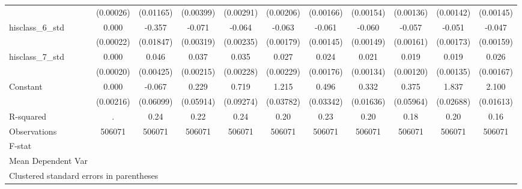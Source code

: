 {\begin{tabular}{l*{10}{c}}
                    &   (0.00026)         &   (0.01165)         &   (0.00399)         &   (0.00291)         &   (0.00206)         &   (0.00166)         &   (0.00154)         &   (0.00136)         &   (0.00142)         &   (0.00145)         \\
hisclass\_6\_std      &       0.000         &      -0.357\sym{***}&      -0.071\sym{***}&      -0.064\sym{***}&      -0.063\sym{***}&      -0.061\sym{***}&      -0.060\sym{***}&      -0.057\sym{***}&      -0.051\sym{***}&      -0.047\sym{***}\\
                    &   (0.00022)         &   (0.01847)         &   (0.00319)         &   (0.00235)         &   (0.00179)         &   (0.00145)         &   (0.00149)         &   (0.00161)         &   (0.00173)         &   (0.00159)         \\
hisclass\_7\_std      &       0.000         &       0.046\sym{***}&       0.037\sym{***}&       0.035\sym{***}&       0.027\sym{***}&       0.024\sym{***}&       0.021\sym{***}&       0.019\sym{***}&       0.019\sym{***}&       0.026\sym{***}\\
                    &   (0.00020)         &   (0.00425)         &   (0.00215)         &   (0.00228)         &   (0.00229)         &   (0.00176)         &   (0.00134)         &   (0.00120)         &   (0.00135)         &   (0.00167)         \\
Constant            &       0.000         &      -0.067         &       0.229\sym{***}&       0.719\sym{***}&       1.215\sym{***}&       0.496\sym{***}&       0.332\sym{***}&       0.375\sym{***}&       1.837\sym{***}&       2.100\sym{***}\\
                    &   (0.00216)         &   (0.06099)         &   (0.05914)         &   (0.09274)         &   (0.03782)         &   (0.03342)         &   (0.01636)         &   (0.05964)         &   (0.02688)         &   (0.01613)         \\
\hline
R-squared           &           .         &        0.24         &        0.22         &        0.24         &        0.20         &        0.23         &        0.20         &        0.18         &        0.20         &        0.16         \\
Observations        &      506071         &      506071         &      506071         &      506071         &      506071         &      506071         &      506071         &      506071         &      506071         &      506071         \\
F-stat              &                     &                     &                     &                     &                     &                     &                     &                     &                     &                     \\
Mean Dependent Var  &                     &                     &                     &                     &                     &                     &                     &                     &                     &                     \\
\hline\hline
\multicolumn{11}{l}{\footnotesize Clustered standard errors in parentheses}\\
\end{tabular}
}
